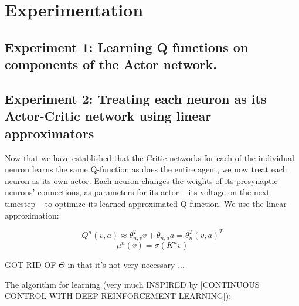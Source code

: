 \section{Experimentation}
\subsection{Experiment 1: Learning Q functions on components of the Actor network.}


\subsection{Experiment 2: Treating each neuron as its Actor-Critic network using linear approximators}

Now that we have established that the Critic networks for each of the individual neuron learns the same Q-function as does the entire agent, we now treat each neuron as its own actor. Each neuron changes the weights of its presynaptic neurons' connections, as parameters for its actor -- its voltage on the next timestep -- to optimize its learned approximated Q function. We use the linear approximation:

$$Q^{n}(v, a) \approx \theta_{n,v}^T v + \theta_{n,a}a = \theta_{n}^T (v, a)^T$$
$$\mu^{n}(v) = \sigma(K^n v)$$

GOT RID OF $\Theta$ in that it's not very necessary ...

The algorithm for learning (very much INSPIRED by [CONTINUOUS CONTROL WITH DEEP REINFORCEMENT
LEARNING]):

